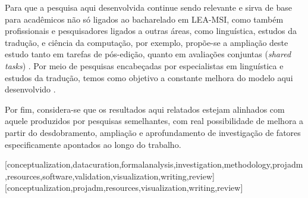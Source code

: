 \documentclass[portuguese]{textolivre}
\begin{document}
Para que a pesquisa aqui desenvolvida continue sendo relevante e sirva de base para acadêmicos não só ligados ao bacharelado em LEA-MSI, como também profissionais e pesquisadores ligados a outras áreas, como linguística, estudos da tradução, e ciência da computação, por exemplo, propõe-se a ampliação deste estudo tanto em tarefas de pós-edição, quanto em avaliações conjuntas (\textit{shared tasks}) \cite{freitas_linguistica_2022}. Por meio de pesquisas encabeçadas por especialistas em linguística e estudos da tradução, temos como objetivo a constante melhora do modelo aqui desenvolvido \cite{freitas_linguistica_2022}.

Por fim, considera-se que os resultados aqui relatados estejam alinhados com aquele produzidos por pesquisas semelhantes, com real possibilidade de melhora a partir do desdobramento, ampliação e aprofundamento de investigação de fatores especificamente apontados ao longo do trabalho.

\printbibliography\label{sec-bib}
\begin{contributors}
[conceptualization,datacuration,formalanalysis,investigation,methodology,projadm,resources,software,validation,visualization,writing,review]
[conceptualization,projadm,resources,visualization,writing,review]
\end{contributors}
\end{document}
